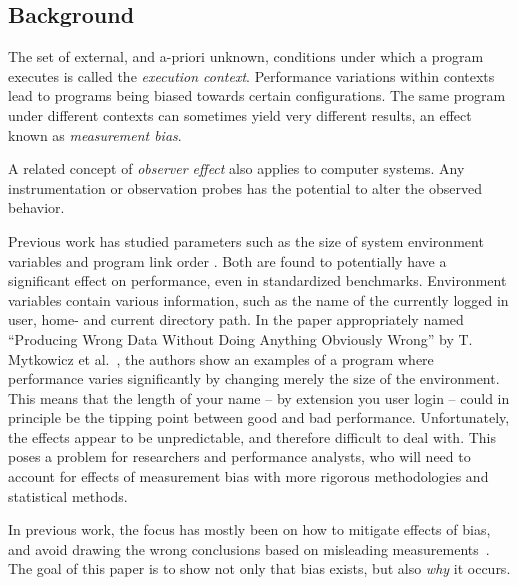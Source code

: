 \documentclass[a4paper,10pt,twocolumn,twoside]{article}
\begin{document}
\subsection{Background}
The set of external, and a-priori unknown, conditions under which a program executes is called the \emph{execution context}. 
Performance variations within contexts lead to programs being biased towards certain configurations. 
The same program under different contexts can sometimes yield very different results, an effect known as \emph{measurement bias}.

A related concept of \emph{observer effect} also applies to computer systems.
Any instrumentation or observation probes has the potential to alter the observed behavior.

Previous work has studied parameters such as the size of system environment variables and program link order \cite{Mytkowicz:2008:OE&MB}. 
Both are found to potentially have a significant effect on performance, even in standardized benchmarks. 
Environment variables contain various information, such as the name of the currently logged in user, home- and current directory path.
In the paper appropriately named ``Producing Wrong Data Without Doing Anything Obviously Wrong'' by T. Mytkowicz et al.~\cite{Mytkowicz:2009:WrongData}, the authors show an examples of a program where performance varies significantly by changing merely the size of the environment. 
This means that the length of your name -- by extension you user login -- could in principle be the tipping point between good and bad performance.
Unfortunately, the effects appear to be unpredictable, and therefore difficult to deal with. 
This poses a problem for researchers and performance analysts, who will need to account for effects of measurement bias with more rigorous methodologies and statistical methods.

In previous work, the focus has mostly been on how to mitigate effects of bias, and avoid drawing the wrong conclusions based on misleading measurements~\cite{Mytkowicz:2008:Easy, Mytkowicz:2009:WrongData}.
The goal of this paper is to show not only that bias exists, but also \emph{why} it occurs. 
\end{document}
